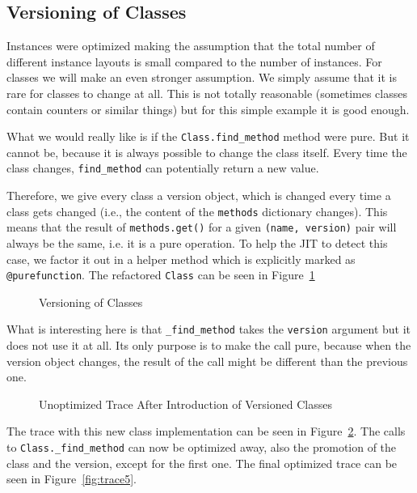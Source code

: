 \documentclass{sigplanconf}
\begin{document}
\subsection{Versioning of Classes}

Instances were optimized making the assumption that the total number of
different instance layouts is small compared to the number of instances. For classes we
will make an even stronger assumption. We simply assume that it is rare for
classes to change at all. This is not totally reasonable (sometimes classes contain
counters or similar things) but for this simple example it is good enough.

What we would really like is if the \texttt{Class.find\_method} method were pure.
But it cannot be, because it is always possible to change the class itself.
Every time the class changes, \texttt{find\_method} can potentially return a
new value.

Therefore, we give every class a version object, which is changed every time a
class gets changed (i.e., the content of the \texttt{methods} dictionary changes).
This means that the result of \texttt{methods.get()} for a given \texttt{(name,
version)} pair will always be the same, i.e. it is a pure operation.  To help
the JIT to detect this case, we factor it out in a helper method which is
explicitly marked as \texttt{@purefunction}. The refactored \texttt{Class} can
be seen in Figure~\ref{fig:version}

\begin{figure}

\caption{Versioning of Classes}
\label{fig:version}
\end{figure}

What is interesting here is that \texttt{\_find\_method} takes the \texttt{version}
argument but it does not use it at all. Its only purpose is to make the call
pure, because when the version object changes, the result of the call might be
different than the previous one.

\begin{figure}

\caption{Unoptimized Trace After Introduction of Versioned Classes}
\label{fig:trace4}
\end{figure}

The trace with this new class implementation can be seen in
Figure~\ref{fig:trace4}.
The calls to \texttt{Class.\_find\_method} can now be optimized away, also the
promotion of the class and the version, except for the first one. The final
optimized trace can be seen in Figure~\ref{fig:trace5}.
\end{document}
